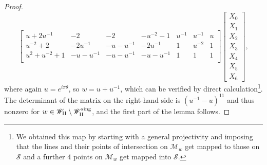 \documentclass[a4paper,reqno]{amsart}
\numberwithin{equation}{section}
\numberwithin{equation}{section}
\begin{document}
\begin{proof}
\begin{equation}
\begin{bmatrix}
 u+2u^{-1} & -2 & -2 & -u^{-2}-1 & u^{-1} & u^{-1} & u \\
 u^{-2}+2 & -2 u^{-1} & -u-u^{-1} & -2 u^{-1} & 1 & u^{-2} & 1 \\
 u^2+u^{-2}+1 & -u - u^{-1} & -u - u^{-1} & -u-u^{-1} & 1 & 1 & 1 \\
\end{bmatrix}
    \begin{bmatrix}
    X_0\\
    X_1\\
    X_2\\
    X_3\\
    X_4\\
    X_5\\
    X_6
    \end{bmatrix},
    \end{equation}
    where again $u=e^{i \pi \theta}$, so $w=u+u^{-1}$, which can be verified by direct calculation\footnote{We obtained this map by starting with a general projectivity and imposing that the lines and their points of intersection on $\mathcal{M}_w$ get mapped to those on $\mathcal{S}$ and a further $4$ points on $\mathcal{M}_w$ get mapped into $\mathcal{S}$.}. The determinant of the matrix on the right-hand side is $(u^{-1}-u)^{11}$ and thus nonzero for $w \in \mathscr{W}_{\rm{II}}\setminus \mathscr{W}_{\rm{II}}^{\operatorname{sing}}$, and the first part of the lemma follows.


\end{proof}
\end{document}
